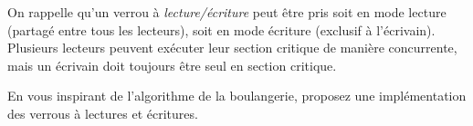
\begingroup

\begin{exercice}
  \label{exo:locks/readwrite}

  On rappelle qu'un verrou à \emph{lecture/écriture} peut être pris soit en
  mode lecture (partagé entre tous les lecteurs),
  soit en mode écriture (exclusif à l'écrivain).
  Plusieurs lecteurs peuvent exécuter leur section critique de manière
  concurrente, mais un écrivain doit toujours être seul en section critique. 

  \begin{question}
  \item En vous inspirant de l'algorithme de la boulangerie,
    proposez une implémentation des verrous à lectures et écritures.
  \end{question}

\end{exercice}

\endgroup
\endinput
